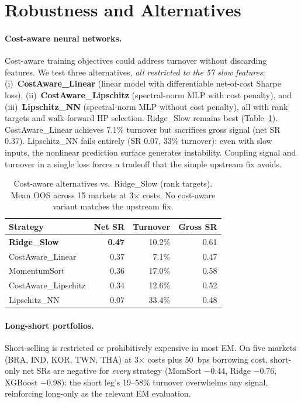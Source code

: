 \documentclass[sigconf,review,anonymous,balance=false]{acmart}
\begin{document}
\section{Robustness and Alternatives}
\label{sec:robustness}

\paragraph{Cost-aware neural networks.}
Cost-aware training objectives could address turnover without
discarding features. We test three alternatives, \emph{all restricted
to the 57 slow features}: (i)~\textbf{CostAware\_\allowbreak Linear} (linear model
with differentiable net-of-cost Sharpe loss),
(ii)~\textbf{CostAware\_\allowbreak Lipschitz} (spectral-norm MLP with cost
penalty), and (iii)~\textbf{Lipschitz\_\allowbreak NN} (spectral-norm MLP without
cost penalty), all with rank targets and walk-forward HP selection.
Ridge\_Slow remains best (Table~\ref{tab:cost_aware_nn}).
CostAware\_Linear achieves 7.1\% turnover but sacrifices gross signal
(net SR 0.37). Lipschitz\_NN fails entirely (SR 0.07, 33\% turnover):
even with slow inputs, the nonlinear prediction surface generates
instability. Coupling signal and turnover in a single loss forces a
tradeoff that the simple upstream fix avoids.

\begin{table}[t]
\centering
\caption{Cost-aware alternatives vs.\ Ridge\_Slow (rank targets).
Mean OOS across 15 markets at 3$\times$ costs. No cost-aware
variant matches the upstream fix.}
\label{tab:cost_aware_nn}
\small
\begin{tabular}{@{}lrrr@{}}
\toprule
Strategy & Net SR & Turnover & Gross SR \\
\midrule
\textbf{Ridge\_Slow}        & \textbf{0.47} & 10.2\% & 0.61 \\
CostAware\_Linear   & 0.37 & 7.1\%  & 0.47 \\
MomentumSort        & 0.36 & 17.0\% & 0.58 \\
CostAware\_Lipschitz & 0.34 & 12.6\% & 0.52 \\
Lipschitz\_NN       & 0.07 & 33.4\% & 0.48 \\
\bottomrule
\end{tabular}
\end{table}

\paragraph{Long-short portfolios.}
Short-selling is restricted or prohibitively expensive in most EM.
On five markets (BRA, IND, KOR, TWN, THA) at 3$\times$ costs plus
50~bps borrowing cost, short-only net SRs are negative for
\emph{every} strategy (MomSort $-$0.44, Ridge $-$0.76, XGBoost
$-$0.98): the short leg's 19--58\% turnover overwhelms any signal,
reinforcing long-only as the relevant EM evaluation.
\end{document}
